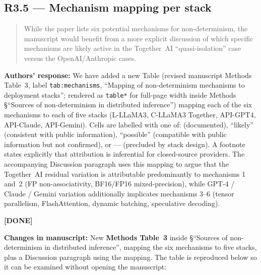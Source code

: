 \documentclass[11pt,a4paper]{article}
\newenvironment{revquote}{%
  \begin{quote}\small\itshape\color{revgray}
}{%
  \end{quote}
}
\newcommand{\response}[1]{\par\noindent\textbf{\color{revgreen}Authors' response:} #1\par}
\newcommand{\changes}[1]{\par\noindent\textbf{\color{revblue}Changes in manuscript:} #1\par}
\newcommand{\done}{\color{revgreen}\textbf{[DONE]}}
\begin{document}
\subsection*{R3.5 --- Mechanism mapping per stack}

\begin{revquote}
While the paper lists six potential mechanisms for non-determinism, the manuscript would benefit from a more explicit discussion of which specific mechanisms are likely active in the Together~AI ``quasi-isolation'' case versus the OpenAI/Anthropic cases.
\end{revquote}

\response{We have added a new Table (revised manuscript Methods Table~3, label \texttt{tab:mechanisms}, ``Mapping of non-determinism mechanisms to deployment stacks''; rendered as \texttt{table*} for full-page width inside Methods §``Sources of non-determinism in distributed inference'') mapping each of the six mechanisms to each of five stacks (L-LLaMA3, C-LLaMA3 Together, API-GPT4, API-Claude, API-Gemini). Cells are labelled with one of: \checkmark (documented), ``likely'' (consistent with public information), ``possible'' (compatible with public information but not confirmed), or --- (precluded by stack design). A footnote states explicitly that attribution is inferential for closed-source providers. The accompanying Discussion paragraph uses this mapping to argue that the Together~AI residual variation is attributable predominantly to mechanisms 1 and~2 (FP non-associativity, BF16/FP16 mixed-precision), while GPT-4 / Claude / Gemini variation additionally implicates mechanisms 3--6 (tensor parallelism, FlashAttention, dynamic batching, speculative decoding).} \done

\changes{New \textbf{Methods Table~3} inside §``Sources of non-determinism in distributed inference'', mapping the six mechanisms to five stacks, plus a Discussion paragraph using the mapping. The table is reproduced below so it can be examined without opening the manuscript:}
\end{document}
